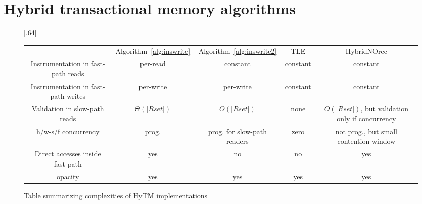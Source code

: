 \vspace{-1mm}
\section{Hybrid transactional memory algorithms}\label{sec:hytmalgos}
%
\begin{figure*}[!t]
      
     \scalebox{.64}[.64]{
     \begin{tabularx}{\textwidth}{c|c|c|c|c}
	~~~~~ & Algorithm~\ref{alg:inswrite} & Algorithm~\ref{alg:inswrite2} & TLE & HybridNOrec\\ 
	Instrumentation in fast-path reads & per-read & constant & constant & constant \\ 
	Instrumentation in fast-path writes & per-write & per-write & constant & constant \\ 
	Validation in slow-path reads & $\Theta(|Rset|)$ & $O(|Rset|)$ & none & $O(|Rset|)$, but validation only if concurrency \\ 
	h/w-s/f concurrency & prog. & prog. for slow-path readers & zero & not prog., but small contention window \\ 
	Direct accesses inside fast-path & yes & no & no & yes \\ 
	opacity & yes & yes & yes & yes 
   \end{tabularx}
\caption{Table summarizing complexities of HyTM implementations}\label{fig:main}    
}
\end{figure*}
%

%
